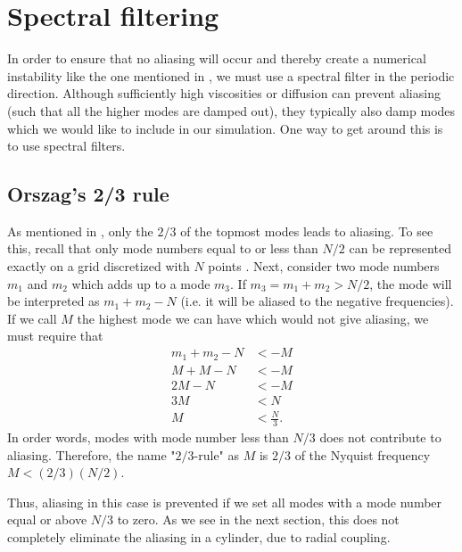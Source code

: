 \section{Spectral filtering}
\label{sec:filt}
%
In order to ensure that no aliasing will occur and thereby create a numerical instability like the one mentioned in \cite{Phillips1959}, we must use a spectral filter in the periodic direction.
Although sufficiently high viscosities or diffusion can prevent aliasing (such that all the higher modes are damped out), they typically also damp modes which we would like to include in our simulation.
One way to get around this is to use spectral filters.

\subsection{Orszag's 2/3 rule}
As mentioned in \cite{Orszag1971}, only the $2/3$ of the topmost modes leads to aliasing.
To see this, recall that only mode numbers equal to or less than $N/2$ can be represented exactly on a grid discretized with $N$ points \cite{Bracewell2000book}.
Next, consider two mode numbers $m_1$ and $m_2$ which adds up to a mode $m_3$.
If $m_3=m_1+m_2>N/2$, the mode will be interpreted as $m_1+m_2 - N$ (i.e. it will be aliased to the negative frequencies).
If we call $M$ the highest mode we can have which would not give aliasing, we must require that
%
\begin{align*}
    m_1+m_2 - N &< -M\\
    M + M - N &< -M\\
    2M - N &< -M\\
    3M &<  N\\
    M &< \frac{N}{3}.
\end{align*}
%
In order words, modes with mode number less than $N/3$ does not contribute to aliasing.
Therefore, the name "$2/3$-rule" as $M$ is $2/3$ of the Nyquist frequency $M < (2/3)(N/2)$.

Thus, aliasing in this case is prevented if we set all modes with a mode number equal or above $N/3$ to zero.
As we see in the next section, this does not completely eliminate the aliasing in a cylinder, due to radial coupling.

